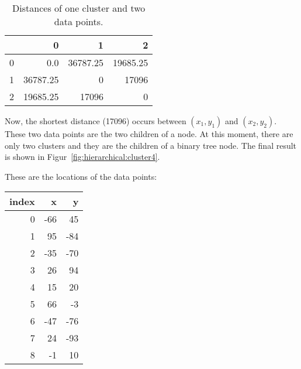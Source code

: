 \begin{table}
  \begin{tt}
\begin{tabular}{|r|rrr|}  \hline
& 0 & 1 & 2   \\ \hline

0 & 0.0 & 36787.25 & 19685.25 \\
1 & 36787.25 & 0 & 17096 \\
2 & 19685.25 & 17096 & 0 \\ \hline
\end{tabular}
  \end{tt}
  \caption{Distances of one cluster and two  data points.}
  \label{table:hierarchical:distance3}
\end{table}

Now, the shortest distance (17096) occurs between $(x_1, y_1)$ and
$(x_2, y_2)$.  These two data points are the two children of a node.
At this moment, there are only two clusters and they are the children
of a binary tree node.  The final result is shown in
Figur~\ref{fig:hierarchical:cluster4}.

\clearpage


These are the locations of the data points:

\hspace{0.1in}
\begin{tt}
\begin{tabular}{|r|rr|} \hline
{\bf index} &  {\bf x} & {\bf y} \\ \hline
0 &  -66  &  45 \\
1 & 95  &  -84 \\
2 & -35  &  -70 \\
3 & 26  &  94 \\
4 & 15  &  20 \\
5 & 66  &  -3 \\
6 & -47  &  -76 \\
7 & 24  &  -93 \\
8 & -1  &  10 \\ \hline
\end{tabular}
\end{tt}
\hspace{0.1in}

